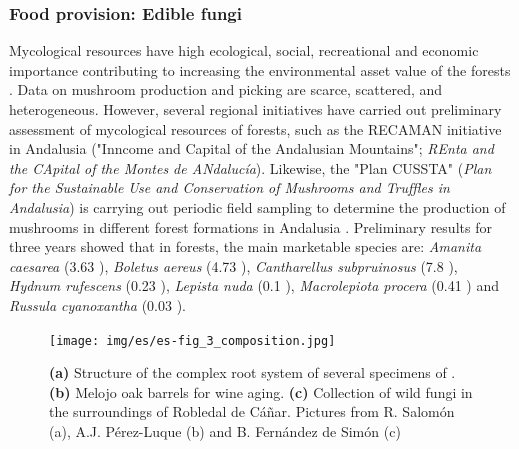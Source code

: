 \subsubsection{Food provision: Edible fungi}\label{sec:es:provision-fungi}
Mycological resources have high ecological, social, recreational and economic importance contributing to increasing the environmental asset value of the forests \autocites{MartinezPenaetal2015RentaAmbiental}. Data on mushroom production and picking are scarce, scattered, and heterogeneous. However, several regional initiatives have carried out preliminary assessment of mycological resources of forests, such as the RECAMAN initiative in Andalusia ("Inncome and Capital of the Andalusian Mountains"; \emph{REnta and the CApital of the Montes de ANdalucía})\autocites{MartinezPenaetal2015RentaAmbiental}. Likewise, the "Plan CUSSTA" (\emph{Plan for the Sustainable Use and Conservation of Mushrooms and Truffles in Andalusia}) is carrying out periodic field sampling to determine the production of mushrooms in different forest formations in Andalusia \autocites{RayaLopezetal2017MuestreosPara}. Preliminary results for three years showed that in \Qp forests, the main marketable species are: \emph{Amanita caesarea} (3.63 \khy), \emph{Boletus aereus} (4.73 \khy), \emph{Cantharellus subpruinosus} (7.8 \khy), \emph{Hydnum rufescens} (0.23 \khy), \emph{Lepista nuda} (0.1 \khy), \emph{Macrolepiota procera} (0.41 \khy) and \emph{Russula cyanoxantha} (0.03 \khy). 

\begin{figure}
    \centering
    \texttt{[image: img/es/es-fig\_3\_composition.jpg]}
    \caption{\textbf{(a)} Structure of the complex root system of several specimens of \Qp. \textbf{(b)} Melojo oak barrels for wine aging. \textbf{(c)} Collection of wild fungi in the surroundings of Robledal de Cáñar. Pictures from R. Salomón (a), A.J. Pérez-Luque (b) and B. Fernández de Simón (c) }\label{fig:es:rootsfungi}
\end{figure}

